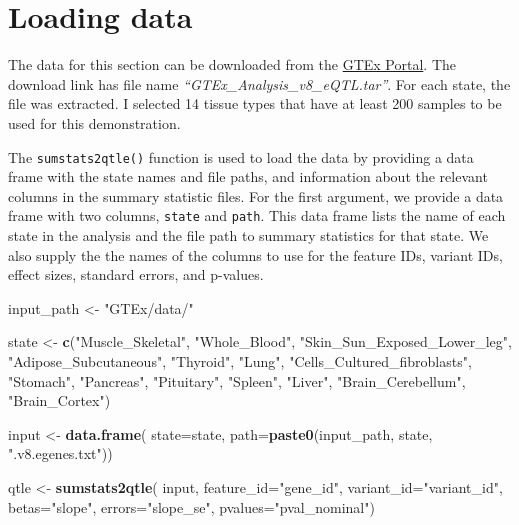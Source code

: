 \documentclass[
]{article}
\newenvironment{Shaded}{\begin{snugshade}}{\end{snugshade}}
\newcommand{\AttributeTok}[1]{\textcolor[rgb]{0.13,0.29,0.53}{#1}}
\newcommand{\FunctionTok}[1]{\textcolor[rgb]{0.13,0.29,0.53}{\textbf{#1}}}
\newcommand{\NormalTok}[1]{#1}
\newcommand{\OtherTok}[1]{\textcolor[rgb]{0.56,0.35,0.01}{#1}}
\newcommand{\StringTok}[1]{\textcolor[rgb]{0.31,0.60,0.02}{#1}}
\begin{document}
\normalsize

\section{Loading data}\label{loading-data}

The data for this section can be downloaded from the
\href{https://www.gtexportal.org/home/downloads/adult-gtex/qtl}{GTEx Portal}.
The download link has file name \emph{``GTEx\_Analysis\_v8\_eQTL.tar''}.
For each state, the file was extracted. I selected 14 tissue types that
have at least 200 samples to be used for this demonstration.

The \texttt{sumstats2qtle()} function is used to load the data by
providing a data frame with the state names and file paths, and
information about the relevant columns in the summary statistic files.
For the first argument, we provide a data frame with two columns,
\texttt{state} and \texttt{path}. This data frame lists the name of each
state in the analysis and the file path to summary statistics for that
state. We also supply the the names of the columns to use for the
feature IDs, variant IDs, effect sizes, standard errors, and p-values.

\footnotesize

\begin{Shaded}
\begin{Highlighting}[]
\NormalTok{input\_path }\OtherTok{\textless{}{-}} \StringTok{"GTEx/data/"}

\NormalTok{state }\OtherTok{\textless{}{-}} \FunctionTok{c}\NormalTok{(}\StringTok{"Muscle\_Skeletal"}\NormalTok{, }\StringTok{"Whole\_Blood"}\NormalTok{, }\StringTok{"Skin\_Sun\_Exposed\_Lower\_leg"}\NormalTok{, }
    \StringTok{"Adipose\_Subcutaneous"}\NormalTok{, }\StringTok{"Thyroid"}\NormalTok{, }\StringTok{"Lung"}\NormalTok{, }\StringTok{"Cells\_Cultured\_fibroblasts"}\NormalTok{, }
    \StringTok{"Stomach"}\NormalTok{, }\StringTok{"Pancreas"}\NormalTok{, }\StringTok{"Pituitary"}\NormalTok{, }\StringTok{"Spleen"}\NormalTok{, }\StringTok{"Liver"}\NormalTok{, }\StringTok{"Brain\_Cerebellum"}\NormalTok{,}
    \StringTok{"Brain\_Cortex"}\NormalTok{)}

\NormalTok{input }\OtherTok{\textless{}{-}} \FunctionTok{data.frame}\NormalTok{(}
    \AttributeTok{state=}\NormalTok{state,}
    \AttributeTok{path=}\FunctionTok{paste0}\NormalTok{(input\_path, state, }\StringTok{".v8.egenes.txt"}\NormalTok{))}

\NormalTok{qtle }\OtherTok{\textless{}{-}} \FunctionTok{sumstats2qtle}\NormalTok{(}
\NormalTok{    input,}
    \AttributeTok{feature\_id=}\StringTok{"gene\_id"}\NormalTok{,}
    \AttributeTok{variant\_id=}\StringTok{"variant\_id"}\NormalTok{,}
    \AttributeTok{betas=}\StringTok{"slope"}\NormalTok{,}
    \AttributeTok{errors=}\StringTok{"slope\_se"}\NormalTok{,}
    \AttributeTok{pvalues=}\StringTok{"pval\_nominal"}\NormalTok{)}
\end{Highlighting}
\end{Shaded}
\end{document}
